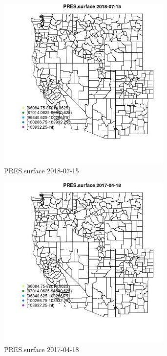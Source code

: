 \begin{figure} 
\centering  
\includegraphics[width=0.77\textwidth]{Code_Outputs/Report_ML_input_PM25_Step4_part_e_de_duplicated_aveswNAs_MapObsPRESsurface2018-07-15.jpg} 
\caption{\label{fig:Report_ML_input_PM25_Step4_part_e_de_duplicated_aveswNAsMapObsPRESsurface2018-07-15}PRES.surface 2018-07-15} 
\end{figure} 
 

\begin{figure} 
\centering  
\includegraphics[width=0.77\textwidth]{Code_Outputs/Report_ML_input_PM25_Step4_part_e_de_duplicated_aveswNAs_MapObsPRESsurface2017-04-18.jpg} 
\caption{\label{fig:Report_ML_input_PM25_Step4_part_e_de_duplicated_aveswNAsMapObsPRESsurface2017-04-18}PRES.surface 2017-04-18} 
\end{figure} 
 

